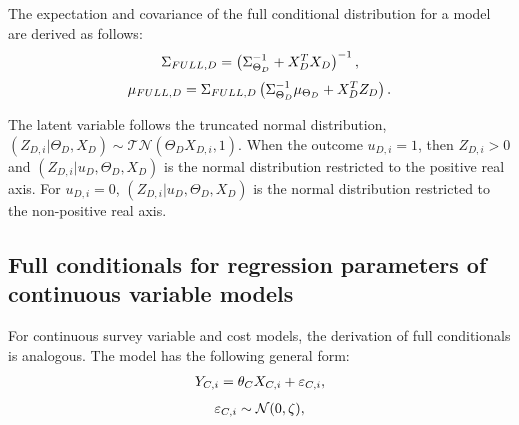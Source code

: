 \documentclass[12pt]{article}
\begin{document}
\begin{appendices}
The expectation and covariance of the full conditional distribution for a model are derived as follows:
\let\saveeqnno\theequation
\let\savefrac\frac
\def\dispfrac{\displaystyle\savefrac}
\begin{eqnarray}
\let\frac\dispfrac
\gdef\theequation{A2}
\let\theHequation\theequation
\label{equation-full-conditionals-dichotomous-sigma}
	\Sigma_{FULL,D}=\left(\Sigma^{-1}_{\Theta_D}+X_D^TX_D\right)^{-1},
\end{eqnarray}
\begin{eqnarray}
\let\frac\dispfrac
\gdef\theequation{A3}
\let\theHequation\theequation
\label{equation-full-conditionals-dichotomous-mu}
	\mu_{FULL,D}=\Sigma_{FULL,D}\left(\Sigma^{-1}_{\Theta_D}\mu_{\Theta_D}+X_D^TZ_D\right).
\end{eqnarray}
\global\let\theequation\saveeqnno
\addtocounter{equation}{-1}\ignorespaces

The latent variable follows the truncated normal distribution, $(Z_{D,i}|\Theta_D,X_D) \sim \mathcal{TN}(\Theta_DX_{D,i},1)$.
When the outcome $u_{D,i}=1$, then $Z_{D,i}>0$ and $(Z_{D,i}|u_{D},\Theta_D,X_D)$ is the normal distribution restricted to the positive real axis.
For $u_{D,i}=0$, $(Z_{D,i}|u_{D},\Theta_D,X_D)$ is the normal distribution restricted to the non-positive real axis.


\subsection{Full conditionals for regression parameters of continuous variable models}
\label{appendix-full-conditionals-continuous-variables}

For continuous survey variable and cost models, the derivation of full conditionals is analogous. The model has the following general form:
\let\saveeqnno\theequation
\let\savefrac\frac
\def\dispfrac{\displaystyle\savefrac}
\begin{eqnarray*}
\let\frac\dispfrac
\let\theHequation\theequation
	Y_{C,i}=\theta_{C}X_{C,i}+\varepsilon_{C,i},
\end{eqnarray*}
\begin{eqnarray*}
\let\frac\dispfrac
\let\theHequation\theequation
	\varepsilon_{C,i} \sim \mathcal{N}(0,\zeta),
\end{eqnarray*}
\global\let\theequation\saveeqnno
\addtocounter{equation}{-1}\ignorespaces


\end{appendices}
\end{document}
